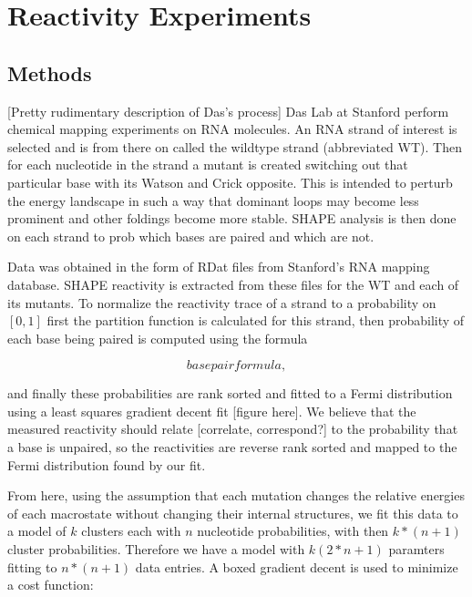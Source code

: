 \chapter{Reactivity Experiments}
\section{Methods} [Pretty rudimentary description of Das's process]
Das Lab at Stanford perform chemical mapping experiments on RNA
molecules. An RNA strand of interest is selected and is from there on
called the wildtype strand (abbreviated WT). Then for each nucleotide
in the strand a mutant is created switching out that particular base
with its Watson and Crick opposite. This is intended to perturb the
energy landscape in such a way that dominant loops may become less
prominent and other foldings become more stable. SHAPE analysis is
then done on each strand to prob which bases are paired and which are
not.

Data was obtained in the form of RDat files from Stanford's RNA
mapping database. SHAPE reactivity is extracted from these files for
the WT and each of its mutants. To normalize the reactivity trace of a
strand to a probability on $[0, 1]$ first the partition function is
calculated for this strand, then probability of each base being paired
is computed using the formula

$$ base pair formula ,$$

and finally these probabilities are rank sorted and fitted to a Fermi
distribution using a least squares gradient decent fit [figure
here]. We believe that the measured reactivity should relate
[correlate, correspond?] to the probability that a base is unpaired,
so the reactivities are reverse rank sorted and mapped to the Fermi
distribution found by our fit.

From here, using the assumption that each mutation changes the
relative energies of each macrostate without changing their internal
structures, we fit this data to a model of $k$ clusters each with $n$
nucleotide probabilities, with then $k*(n+1)$ cluster
probabilities. Therefore we have a model with $k(2*n + 1)$ paramters
fitting to $n*(n+1)$ data entries. A boxed gradient decent is used to
minimize a cost function:

